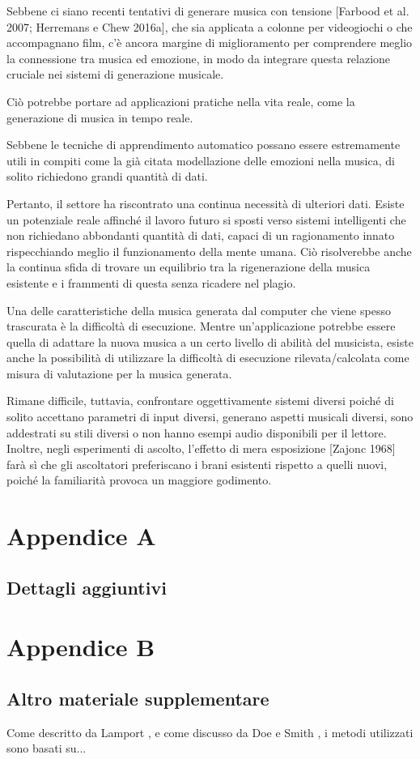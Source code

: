 \documentclass[a4paper,12pt]{report}
\begin{document}
Sebbene ci siano recenti tentativi di generare musica con tensione [Farbood et al. 2007; Herremans e Chew 2016a], che sia applicata a colonne per videogiochi o che accompagnano film, c’è ancora margine di miglioramento per comprendere meglio la connessione tra musica ed emozione, 
in modo da integrare questa relazione cruciale nei sistemi di generazione musicale. 

Ciò potrebbe portare ad applicazioni pratiche nella vita reale, come la generazione di musica in tempo reale.

Sebbene le tecniche di apprendimento automatico possano essere estremamente utili in compiti come la già citata modellazione delle emozioni nella musica, di solito richiedono grandi quantità di dati. 

Pertanto, il settore ha riscontrato una continua necessità di ulteriori dati. 
Esiste un potenziale reale affinché il lavoro futuro si sposti verso sistemi intelligenti che non richiedano abbondanti quantità di dati, capaci di un ragionamento innato rispecchiando meglio il funzionamento della mente umana. 
Ciò risolverebbe anche la continua sfida di trovare un equilibrio tra la rigenerazione della musica esistente e i frammenti di questa senza ricadere nel plagio.

Una delle caratteristiche della musica generata dal computer che viene spesso trascurata è la difficoltà di esecuzione. 
Mentre un'applicazione potrebbe essere quella di adattare la nuova musica a un certo livello di abilità del musicista, esiste anche la possibilità di utilizzare la difficoltà di esecuzione rilevata/calcolata come misura di valutazione per la musica generata.

Rimane difficile, tuttavia, confrontare oggettivamente sistemi diversi poiché di solito accettano parametri di input diversi, generano aspetti musicali diversi, sono addestrati su stili diversi o non hanno esempi audio disponibili per il lettore. Inoltre, negli esperimenti di ascolto, l’effetto di mera esposizione [Zajonc 1968] farà sì che gli ascoltatori preferiscano i brani esistenti rispetto a quelli nuovi, poiché la familiarità provoca un maggiore godimento.

\appendix
\chapter{Appendice A}
\section{Dettagli aggiuntivi}

\chapter{Appendice B}
\section{Altro materiale supplementare}

Come descritto da Lamport \cite{latex}, e come discusso da Doe e Smith \cite{example_article}, i metodi utilizzati sono basati su...



\end{document}
